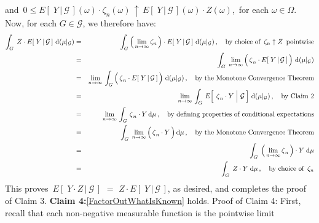 \begin{enumerate}
	and
	\,$0 \leq E\!\left[\;Y\,\vert\,\mathcal{G}\,\right](\omega) \cdot \zeta_{n}(\omega) \,\uparrow\, E\!\left[\;Y\,\vert\,\mathcal{G}\,\right](\omega) \cdot Z(\omega)$,\,
	for each $\omega \in \Omega$.
	Now, for each $G \in \mathcal{G}$, we therefore have:
	\begin{eqnarray*}
	\int_{G}\;Z \cdot E\!\left[\;Y\,\vert\,\mathcal{G}\,\right]\,\d(\mu\vert_{\mathcal{G}})
	&=&
		\int_{G}
			\left(\,\underset{n\rightarrow\infty}{\lim}\,\zeta_{n}\,\right)
			\cdot
			E\!\left[\;Y\,\vert\,\mathcal{G}\,\right]
			\,\d(\mu\vert_{\mathcal{G}})
			\,,\quad\textnormal{by choice of \,$\zeta_{n}\uparrow Z$\, pointwise}
	\\
	&=&
		\int_{G}\;
			\underset{n\rightarrow\infty}{\lim}\left(\,
				\overset{{\color{white}.}}{\zeta}_{n} \cdot E\!\left[\;Y\,\vert\,\mathcal{G}\,\right]
				\,\right)
			\,\d(\mu\vert_{\mathcal{G}})
	\\
	&=&
		\underset{n\rightarrow\infty}{\lim}\,
			\int_{G}\left(\,
				\overset{{\color{white}.}}{\zeta}_{n} \cdot E\!\left[\;Y\,\vert\,\mathcal{G}\,\right]
				\,\right)
			\,\d(\mu\vert_{\mathcal{G}})
			\,,\quad\textnormal{by the Monotone Convergence Theorem}
	\\
	&=&
		\underset{n\rightarrow\infty}{\lim}\,
			\int_{G}\,
				E\!\left[\;\left.\overset{{\color{white}.}}{\zeta}_{n} \cdot Y\;\right\vert\,\mathcal{G}\,\right]
			\,\d(\mu\vert_{\mathcal{G}})
			\,,\quad\textnormal{by Claim 2}
	\\
	&=&
		\underset{n\rightarrow\infty}{\lim}\,
			\int_{G}\,
				\overset{{\color{white}.}}{\zeta}_{n} \cdot Y
			\,\d\mu
			\,,\quad\textnormal{by defining properties of conditional expectations}
	\\
	&=&
		\int_{G}\;
			\underset{n\rightarrow\infty}{\lim}\left(\,\overset{{\color{white}.}}{\zeta}_{n} \cdot Y\,\right)
			\d\mu
			\,,\quad\textnormal{by the Monotone Convergence Theorem}
	\\
	&=&
		\int_{G}\;
			\left(\,\underset{n\rightarrow\infty}{\lim}\,\overset{{\color{white}.}}{\zeta}_{n}\,\right) \cdot Y
			\;\d\mu
	\\
	&=&
		\int_{G}\; Z \cdot Y \;\d\mu
			\,,\quad\textnormal{by choice of \,$\zeta_{n}$}
	\end{eqnarray*}
	This proves \,$E\!\left[\;Y \cdot Z\,\vert\,\mathcal{G}\,\right]$ $=$ $Z \cdot E\!\left[\;Y\,\vert\,\mathcal{G}\,\right]$,
	as desired, and completes the proof of Claim 3.
	\vskip 0.4cm
	\textbf{Claim 4:}\;\;\eqref{FactorOutWhatIsKnown} holds.
	\vskip 0.0cm
	Proof of Claim 4: First, recall that each non-negative measurable function is the pointwise limit

\end{enumerate}
